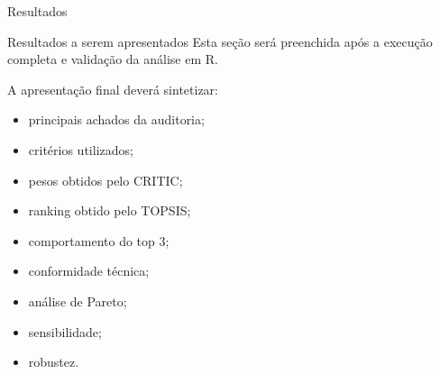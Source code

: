 %
%
%
%
%
%



\begin{frame}{Resultados}

    \begin{block}{Resultados a serem apresentados}
        Esta seção será preenchida após a execução completa e validação
        da análise em R.
    \end{block}

    \vspace{0.3cm}

    A apresentação final deverá sintetizar:

    \begin{itemize}
        \item principais achados da auditoria;
        \item critérios utilizados;
        \item pesos obtidos pelo CRITIC;
        \item ranking obtido pelo TOPSIS;
        \item comportamento do top 3;
        \item conformidade técnica;
        \item análise de Pareto;
        \item sensibilidade;
        \item robustez.
    \end{itemize}

\end{frame}



